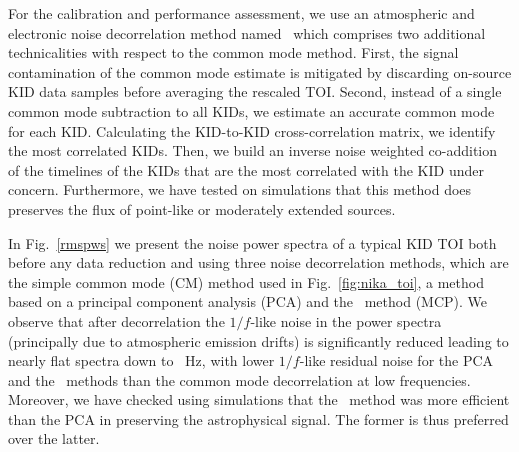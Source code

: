{\lp For the calibration and performance assessment, we use an
atmospheric and electronic noise
decorrelation method named \cmoneb\, which comprises two
additional technicalities with respect to the common mode
method.} First, the signal contamination of the common mode estimate
is mitigated by discarding on-source KID data samples before averaging
the rescaled TOI. Second, instead of a single common mode subtraction to
all KIDs, we estimate an accurate common mode for each
KID. Calculating the KID-to-KID cross-correlation matrix, we
identify the most correlated KIDs. Then, we build an
inverse noise weighted co-addition of the timelines of the %
KIDs that are the most correlated with the KID under
concern. Furthermore, we have tested on simulations that this method
does preserves the flux of {\lp point-like or moderately extended sources.}

In Fig.~\ref{rmspws} we present the noise power spectra of
a typical KID TOI both before any data reduction and using three noise
decorrelation methods, which are the simple common mode (CM) method
used in Fig.~\ref{fig:nika_toi}, a method based on a principal component
analysis (PCA) and the \cmoneb\ method (MCP). We observe that after decorrelation the
$1/f$-like noise in the power spectra (principally due to atmospheric
emission drifts)
is significantly reduced leading to nearly flat spectra down to {~Hz}, with
lower $1/f$-like residual noise for the PCA and the \cmoneb\ methods
than the common mode decorrelation at low frequencies. {\lp Moreover, we
have checked using simulations that the \cmoneb\ method was more
efficient than the PCA in preserving the astrophysical signal. The
former is thus preferred over the latter.} 

